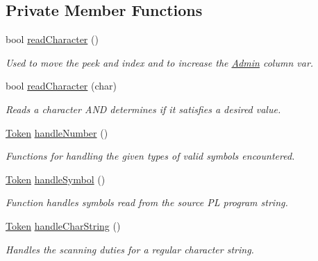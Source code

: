 \subsection*{Private Member Functions}
\begin{DoxyCompactItemize}
\item 
bool \hyperlink{classScanner_a061b8284e974b60bece52e2758626c5c}{readCharacter} ()
\begin{DoxyCompactList}\small\item\em Used to move the peek and index and to increase the \hyperlink{classAdmin}{Admin} column var. \end{DoxyCompactList}\item 
bool \hyperlink{classScanner_a7a3f12786edc746328451403aaa94288}{readCharacter} (char)
\begin{DoxyCompactList}\small\item\em Reads a character AND determines if it satisfies a desired value. \end{DoxyCompactList}\item 
\hyperlink{classToken}{Token} \hyperlink{classScanner_a7e893ad25781c012e020998b327828bd}{handleNumber} ()
\begin{DoxyCompactList}\small\item\em Functions for handling the given types of valid symbols encountered. \end{DoxyCompactList}\item 
\hyperlink{classToken}{Token} \hyperlink{classScanner_a245e35355ef6e5e9206faa99f3ddc9d5}{handleSymbol} ()
\begin{DoxyCompactList}\small\item\em Function handles symbols read from the source PL program string. \end{DoxyCompactList}\item 
\hyperlink{classToken}{Token} \hyperlink{classScanner_a5c9ba68f3ad81f1c95d42e0edcada347}{handleCharString} ()
\begin{DoxyCompactList}\small\item\em Handles the scanning duties for a regular character string. \end{DoxyCompactList}\end{DoxyCompactItemize}
